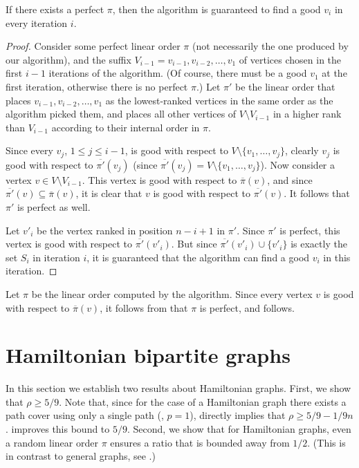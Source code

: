 \documentclass{toc}
\theoremstyle{plain}
\newcommand{\precvpi}{\overline{\pi}(v)}
\begin{document}
\begin{lemma}
	If there exists a perfect $\pi$, then the algorithm is guaranteed to find a good $v_i$ in every iteration $i$.
\end{lemma}
\begin{proof}
	Consider some perfect linear order $\pi$ (not necessarily the one produced by our algorithm), and the suffix $V_{i-1}=v_{i-1},v_{i-2},\ldots,v_1$ of vertices chosen in the first $i-1$ iterations of the
algorithm. %
(Of course, there must be a good $v_1$ at the first iteration, otherwise there is no perfect $\pi$.)  %
 Let $\pi'$ be the linear order that places $v_{i-1},v_{i-2},\ldots,v_1$ as the lowest-ranked %
vertices in the same order as the algorithm picked them, and places all other vertices of $V\setminus V_{i-1}$ in a higher rank than $V_{i-1}$ according to their internal order in $\pi$.
	
Since every $v_j$, $1\leq j\leq i-1$, is good with respect to $V\setminus \{v_1,\ldots, v_{j}\}$, %
clearly $v_j$ is good with respect to $\overline{\pi'}(v_j)$ (since $\overline{\pi'}(v_j) = V\setminus \{v_1,\ldots, v_{j}\}$). Now consider a vertex $v\in V\setminus V_{i-1}$. This vertex is good with respect to $\precvpi$, and since $\overline{\pi'}(v)\subseteq  \precvpi$, it is clear that $v$ is good with respect to $\overline{\pi'}(v)$. It follows that $\pi'$ is perfect as well.
	
	Let $v'_{i}$ be the vertex ranked in position $n-i+1$ in $\pi'$. Since $\pi'$ is perfect, this vertex is good with respect to $\overline{\pi'}(v'_i)$. But since $\overline{\pi'}(v'_i)\cup \{v'_{i}\}$ is exactly the set $S_i$ in iteration $i$, it is guaranteed that the algorithm can find a good $v_i$ in this iteration.
\end{proof}

Let $\pi$ be the linear order computed by the algorithm. Since every vertex $v$ is good with respect to $\precvpi$, it follows from  that $\pi$ is perfect, and  follows. 


\section{Hamiltonian bipartite graphs}
\label{sec:hamiltonian}

In this section we establish two results about Hamiltonian graphs.
First, we show that %
$\rho \ge 5/9$.   %
Note that, since for the case of a Hamiltonian graph there exists a path cover using only a single path
%
(\ie, $p=1$),  directly implies that 
%
$\rho \ge 5/9 - 1/9n$.
 improves this bound to $5/9$.
Second, we show that for Hamiltonian graphs, even a random linear order $\pi$ ensures a ratio that is bounded away from %
$1/2$.  %
(This is in contrast to general graphs, see .) %
\end{document}
